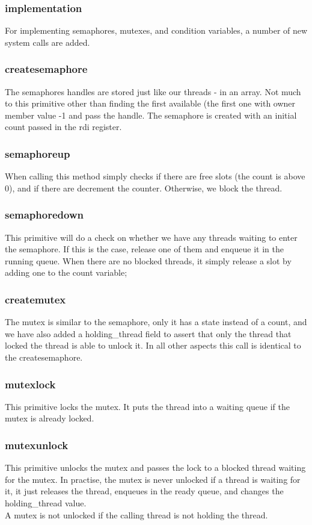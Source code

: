 \subsubsection{implementation}
For implementing semaphores, mutexes, and condition variables, a number of new system calls are added.
\subsubsection*{createsemaphore}
The semaphores handles are stored just like our threads - in an array. Not much to this primitive other than finding the first available (the first one with owner member value -1 and pass the handle. The semaphore is created with an initial count passed in the rdi register.
\subsubsection*{semaphoreup}
When calling this method simply checks if there are free slots (the count is above 0), and if there are decrement the counter. Otherwise, we block the thread.
\subsubsection*{semaphoredown}
This primitive will do a check on whether we have any threads waiting to enter the semaphore. If this is the case, release one of them and enqueue it in the running queue. When there are no blocked threads, it simply release a slot by adding one to the count variable;

\subsubsection*{createmutex}
The mutex is similar to the semaphore, only it has a state instead of a count, and we have also added a holding\_thread field to assert that only 
the thread that locked the thread is able to unlock it. In all other aspects this call is identical to the createsemaphore.

\subsubsection*{mutexlock}
This primitive locks the mutex. It puts the thread into a waiting queue if the mutex is already locked.
\subsubsection*{mutexunlock}
This primitive unlocks the mutex and passes the lock to a blocked thread waiting for the mutex. In practise, the mutex is never unlocked if a thread is waiting for it, it just releases the thread, enqueues in the ready queue, and changes the holding\_thread value.\\
A mutex is not unlocked if the calling thread is not holding the thread.

